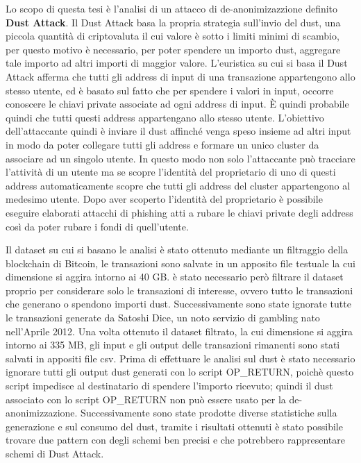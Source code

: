 Lo scopo di questa tesi è l'analisi di un attacco di de-anonimizazzione definito \textbf{Dust Attack}. Il Dust Attack basa la propria strategia sull'invio del dust, una piccola quantità di criptovaluta il cui valore è sotto i limiti minimi di scambio, per questo motivo è necessario, per poter spendere un importo dust, aggregare tale importo ad altri importi di maggior valore. L'euristica su cui si basa il Dust Attack afferma che tutti gli address di input di una transazione appartengono allo stesso utente, ed è basato sul fatto che per spendere i valori in input, occorre conoscere le chiavi private associate ad ogni address di input. È quindi probabile quindi che tutti questi address appartengano allo stesso utente. L'obiettivo dell'attaccante quindi è inviare il dust affinché venga speso insieme ad altri input in modo da poter collegare tutti gli address e formare un unico cluster da associare ad un singolo utente. In questo modo non solo l'attaccante può tracciare l'attività di un utente ma se scopre l'identità del proprietario di uno di questi address automaticamente scopre che tutti gli address del cluster appartengono al medesimo utente. Dopo aver scoperto l'identità del proprietario è possibile eseguire elaborati attacchi di phishing atti a rubare le chiavi private degli address così da poter rubare i fondi di quell'utente.

Il dataset su cui si basano le analisi è stato ottenuto mediante un filtraggio della blockchain di Bitcoin, le transazioni sono salvate in un apposito file testuale la cui dimensione si aggira intorno ai 40 GB. è stato necessario però filtrare il dataset proprio per considerare solo le transazioni di interesse, ovvero tutto le transazioni che generano o spendono importi dust. Successivamente sono state ignorate tutte le transazioni generate da Satoshi Dice, un noto servizio di gambling nato nell'Aprile 2012. Una volta ottenuto il dataset filtrato, la cui dimensione si aggira intorno ai 335 MB, gli input e gli output delle transazioni rimanenti sono stati salvati in appositi file csv. Prima di effettuare le analisi sul dust è stato necessario ignorare tutti gli output dust generati con lo script OP\_RETURN, poichè questo script impedisce al destinatario di spendere l'importo ricevuto; quindi il dust associato con lo script OP\_RETURN non può essere usato per la de-anonimizzazione. Successivamente sono state prodotte diverse statistiche sulla generazione e sul consumo del dust, tramite i risultati ottenuti è stato possibile trovare due pattern con degli schemi ben precisi e che potrebbero rappresentare schemi di Dust Attack.
 
